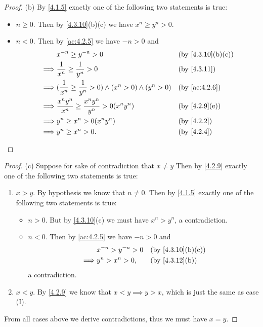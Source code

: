 \begin{proof}{(b)}
	By \cref{4.1.5} exactly one of the following two statements is true:
	\begin{itemize}
		\item \(n \geq 0\).
		      Then by \cref{4.3.10}(b)(c) we have \(x^n \geq y^n > 0\).
		\item \(n < 0\).
		      Then by \cref{ac:4.2.5} we have \(-n > 0\) and
		      \begin{align*}
			               & x^{-n} \geq y^{-n} > 0                                                   &  & \text{(by \cref{4.3.10}(b)(c))} \\
			      \implies & \dfrac{1}{x^n} \geq \dfrac{1}{y^n} > 0                                   &  & \by{4.3.11}                     \\
			      \implies & (\dfrac{1}{x^n} \geq \dfrac{1}{y^n} > 0) \land (x^n > 0) \land (y^n > 0) &  & \by{ac:4.2.6}                   \\
			      \implies & \dfrac{x^n y^n}{x^n} \geq \dfrac{x^n y^n}{y^n} > 0(x^n y^n)              &  & \text{(by \cref{4.2.9}(e))}     \\
			      \implies & y^n \geq x^n > 0(x^n y^n)                                                &  & \by{4.2.2}                      \\
			      \implies & y^n \geq x^n > 0.                                                        &  & \by{4.2.4}
		      \end{align*}
	\end{itemize}
\end{proof}

\begin{proof}{(c)}
	Suppose for sake of contradiction that \(x \neq y\)
	Then by \cref{4.2.9} exactly one of the following two statements is true:
	\begin{enumerate}[label=(\Roman*)]
		\item \(x > y\).
		      By hypothesis we know that \(n \neq 0\).
		      Then by \cref{4.1.5} exactly one of the following two statements is true:
		      \begin{itemize}
			      \item \(n > 0\).
			            But by \cref{4.3.10}(c) we must have \(x^n > y^n\), a contradiction.
			      \item \(n < 0\).
			            Then by \cref{ac:4.2.5} we have \(-n > 0\) and
			            \begin{align*}
				                     & x^{-n} > y^{-n} > 0 &  & \text{(by \cref{4.3.10}(b)(c))} \\
				            \implies & y^n > x^n > 0,      &  & \text{(by \cref{4.3.12}(b))}
			            \end{align*}
			            a contradiction.
		      \end{itemize}
		\item \(x < y\).
		      By \cref{4.2.9} we know that \(x < y \implies y > x\), which is just the same as case (I).
	\end{enumerate}
	From all cases above we derive contradictions, thus we must have \(x = y\).
\end{proof}

